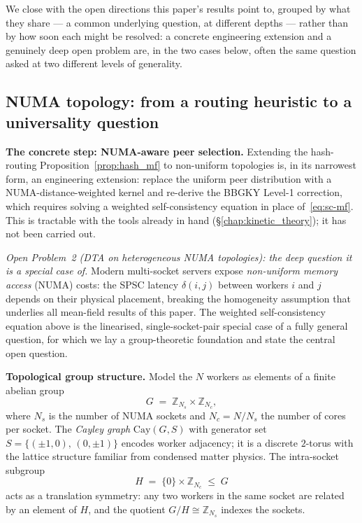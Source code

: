 \documentclass[11pt,a4paper]{report}
\begin{document}
We close with the open directions this paper's results point to,
grouped by what they share --- a common underlying question, at
different depths --- rather than by how soon each might be resolved:
a concrete engineering extension and a genuinely deep open problem
are, in the two cases below, often the same question asked at two
different levels of generality.

\subsection{NUMA topology: from a routing heuristic to a universality question}

\medskip
\noindent\textbf{The concrete step: NUMA-aware peer selection.}
Extending the hash-routing Proposition~\ref{prop:hash_mf} to
non-uniform topologies is, in its narrowest form, an engineering
extension: replace the uniform peer distribution with a
NUMA-distance-weighted kernel and re-derive the BBGKY Level-1
correction, which requires solving a weighted self-consistency
equation in place of~\eqref{eq:sc-mf}. This is tractable with the
tools already in hand (\S\ref{chap:kinetic_theory}); it has not been
carried out.

\medskip
\noindent\textit{Open Problem~2 (DTA on heterogeneous NUMA topologies): the
deep question it is a special case of.}
Modern multi-socket servers expose \emph{non-uniform memory access}
(NUMA) costs: the SPSC latency $\delta(i,j)$ between workers $i$ and
$j$ depends on their physical placement, breaking the homogeneity
assumption that underlies all mean-field results of this paper. The
weighted self-consistency equation above is the linearised,
single-socket-pair special case of a fully general question, for
which we lay a group-theoretic foundation and state the central open
question.

\medskip
\noindent\textbf{Topological group structure.}
Model the $N$ workers as elements of a finite abelian group
\begin{equation}\label{eq:numa_group}
  G \;=\; \mathbb{Z}_{N_s} \times \mathbb{Z}_{N_c},
\end{equation}
where $N_s$ is the number of NUMA sockets and $N_c = N/N_s$ the number of
cores per socket.  The \emph{Cayley graph} $\mathrm{Cay}(G,S)$ with generator
set $S = \{(\pm 1, 0),\, (0, \pm 1)\}$ encodes worker adjacency; it is a
discrete $2$-torus with the lattice structure familiar from condensed matter
physics.  The intra-socket subgroup
\[
  H \;=\; \{0\} \times \mathbb{Z}_{N_c} \;\leq\; G
\]
acts as a translation symmetry: any two workers in the same socket are
related by an element of $H$, and the quotient $G/H \cong \mathbb{Z}_{N_s}$
indexes the sockets.
\end{document}
